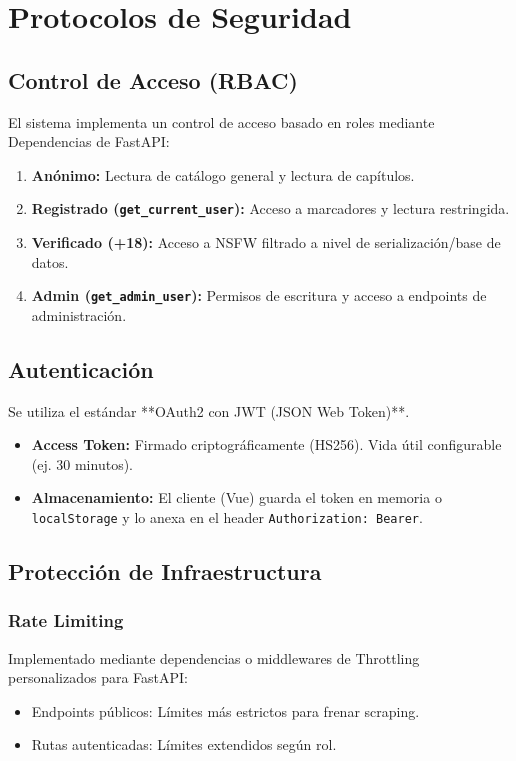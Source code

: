 \section{Protocolos de Seguridad}

\subsection{Control de Acceso (RBAC)}
El sistema implementa un control de acceso basado en roles mediante Dependencias de FastAPI:

\begin{enumerate}
    \item \textbf{Anónimo:} Lectura de catálogo general y lectura de capítulos.
    \item \textbf{Registrado (\texttt{get\_current\_user}):} Acceso a marcadores y lectura restringida.
    \item \textbf{Verificado (+18):} Acceso a NSFW filtrado a nivel de serialización/base de datos.
    \item \textbf{Admin (\texttt{get\_admin\_user}):} Permisos de escritura y acceso a endpoints de administración.
\end{enumerate}

\subsection{Autenticación}
Se utiliza el estándar **OAuth2 con JWT (JSON Web Token)**.
\begin{itemize}
    \item \textbf{Access Token:} Firmado criptográficamente (HS256). Vida útil configurable (ej. 30 minutos).
    \item \textbf{Almacenamiento:} El cliente (Vue) guarda el token en memoria o \texttt{localStorage} y lo anexa en el header \texttt{Authorization: Bearer}.
\end{itemize}

\subsection{Protección de Infraestructura}
\subsubsection{Rate Limiting}
Implementado mediante dependencias o middlewares de Throttling personalizados para FastAPI:
\begin{itemize}
    \item Endpoints públicos: Límites más estrictos para frenar scraping.
    \item Rutas autenticadas: Límites extendidos según rol.
\end{itemize}

